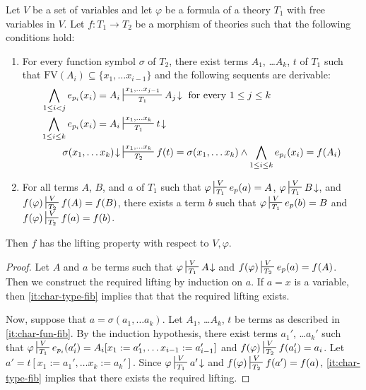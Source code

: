 \documentclass[reqno]{amsart}
\theoremstyle{definition}
\theoremstyle{remark}
\newcommand{\repl}{:=}
\newcommand{\FV}{\mathrm{FV}}
\numberwithin{figure}{section}
\begin{document}
\begin{lem}
Let $V$ be a set of variables and let $\varphi$ be a formula of a theory $T_1$ with free variables in $V$.
Let $f : T_1 \to T_2$ be a morphism of theories such that the following conditions hold:
\begin{enumerate}
\item \label{it:char-fun-fib} For every function symbol $\sigma$ of $T_2$, there exist terms $A_1$, \ldots $A_k$, $t$ of $T_1$ such that $\FV(A_i) \subseteq \{ x_1, \ldots x_{i-1} \}$ and the following sequents are derivable:
\begin{align*}
\bigwedge_{1 \leq i < j} e_{p_i}(x_i) = A_i & \sststile{T_1}{x_1, \ldots x_{j-1}} A_j\!\downarrow \text{ for every } 1 \leq j \leq k \\
\bigwedge_{1 \leq i \leq k} e_{p_i}(x_i) = A_i & \sststile{T_1}{x_1, \ldots x_k} t\!\downarrow \\
\sigma(x_1, \ldots x_k)\!\downarrow & \sststile{T_2}{x_1, \ldots x_k} f(t) = \sigma(x_1, \ldots x_k) \land \bigwedge_{1 \leq i \leq k} e_{p_i}(x_i) = f(A_i)
\end{align*}
\item \label{it:char-type-fib} For all terms $A$, $B$, and $a$ of $T_1$ such that $\varphi \sststile{T_1}{V} e_p(a) = A$, $\varphi \sststile{T_1}{V} B\!\downarrow$, and $f(\varphi) \sststile{T_2}{V} f(A) = f(B)$,
there exists a term $b$ such that $\varphi \sststile{T_1}{V} e_p(b) = B$ and $f(\varphi) \sststile{T_2}{V} f(a) = f(b)$.
\end{enumerate}
Then $f$ has the lifting property with respect to $V,\varphi$.
\end{lem}
\begin{proof}
Let $A$ and $a$ be terms such that $\varphi \sststile{T_1}{V} A\!\downarrow$ and $f(\varphi) \sststile{T_2}{V} e_p(a) = f(A)$.
Then we construct the required lifting by induction on $a$.
If $a = x$ is a variable, then \eqref{it:char-type-fib} implies that that the required lifting exists.

Now, suppose that $a = \sigma(a_1, \ldots a_k)$.
Let $A_1$, \ldots $A_k$, $t$ be terms as described in \eqref{it:char-fun-fib}.
By the induction hypothesis, there exist terms $a_1'$, \ldots $a_k'$ such that $\varphi \sststile{T_1}{V} e_{p_i}(a_i') = A_i[x_1 \repl a_1', \ldots x_{i-1} \repl a_{i-1}']$ and $f(\varphi) \sststile{T_2}{V} f(a_i') = a_i$.
Let $a' = t[x_1 \repl a_1', \ldots x_k \repl a_k']$.
Since $\varphi \sststile{T_1}{V} a'\!\downarrow$ and $f(\varphi) \sststile{T_2}{V} f(a') = f(a)$, \eqref{it:char-type-fib} implies that there exists the required lifting.
\end{proof}
\end{document}
